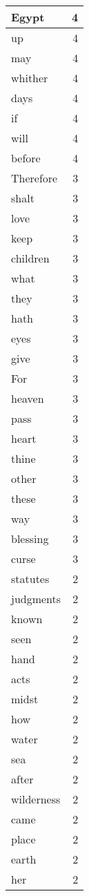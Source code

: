 \begin{center}
\begin{longtable}{l|r}
Egypt & 4 \\ \hline
up & 4 \\ \hline
may & 4 \\ \hline
whither & 4 \\ \hline
days & 4 \\ \hline
if & 4 \\ \hline
will & 4 \\ \hline
before & 4 \\ \hline
Therefore & 3 \\ \hline
shalt & 3 \\ \hline
love & 3 \\ \hline
keep & 3 \\ \hline
children & 3 \\ \hline
what & 3 \\ \hline
they & 3 \\ \hline
hath & 3 \\ \hline
eyes & 3 \\ \hline
give & 3 \\ \hline
For & 3 \\ \hline
heaven & 3 \\ \hline
pass & 3 \\ \hline
heart & 3 \\ \hline
thine & 3 \\ \hline
other & 3 \\ \hline
these & 3 \\ \hline
way & 3 \\ \hline
blessing & 3 \\ \hline
curse & 3 \\ \hline
statutes & 2 \\ \hline
judgments & 2 \\ \hline
known & 2 \\ \hline
seen & 2 \\ \hline
hand & 2 \\ \hline
acts & 2 \\ \hline
midst & 2 \\ \hline
how & 2 \\ \hline
water & 2 \\ \hline
sea & 2 \\ \hline
after & 2 \\ \hline
wilderness & 2 \\ \hline
came & 2 \\ \hline
place & 2 \\ \hline
earth & 2 \\ \hline
her & 2 \\ \hline

\end{longtable}
\end{center}
